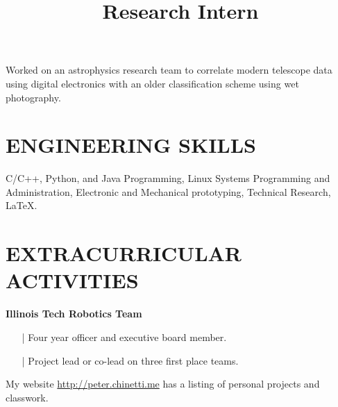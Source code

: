 \documentclass{res}
\begin{document}
\begin{resume}
\title{\bf Research Intern}
\begin{position}
      Worked on an astrophysics research team to correlate modern telescope data using digital electronics with an older classification scheme using wet photography.
\end{position}



\section{ENGINEERING SKILLS}          
 C/C++, Python, and Java Programming, Linux Systems Programming and Administration, Electronic and Mechanical prototyping, Technical Research, \LaTeX{}.
 
 
 
\section{EXTRACURRICULAR ACTIVITIES}          
        {\bf Illinois Tech Robotics Team}
        \begin{itemize}
        \item[|] Four year officer and executive board member.
        \item[|] Project lead or co-lead on three first place teams.
        \end{itemize}
        My website \url{http://peter.chinetti.me} has a listing of personal projects and classwork.
\end{resume}
\end{document}
